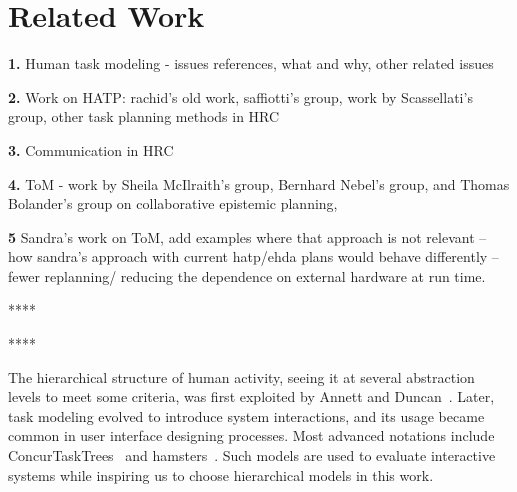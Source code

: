 \documentclass[letterpaper]{article} %
\begin{document}

\section{Related Work}
\textbf{1.} Human task modeling - issues references, what and why, other related issues

\textbf{2.} Work on HATP: rachid's old work, saffiotti's group, work by Scassellati's group, other task planning methods in HRC

\textbf{3.} Communication in HRC

\textbf{4.} ToM - work by Sheila McIlraith's group, Bernhard Nebel's group, and Thomas Bolander's group on collaborative epistemic planning, 

\textbf{5} Sandra's work on ToM, add examples where that approach is not relevant   -- how sandra's approach with current hatp/ehda plans would behave differently -- fewer replanning/ reducing the dependence on external hardware at run time.


****

****

The hierarchical structure of human activity, seeing it at several abstraction levels to meet some criteria, was first exploited by Annett and Duncan~\citeyear{annett1967task}. Later, task modeling evolved to introduce system interactions, and its usage became common in user interface designing processes. Most advanced notations include {\sc ConcurTaskTrees}~\cite{paterno2004concurtasktrees} and {\sc hamsters}~\cite{martinie2019analysing}.
Such models are used to evaluate interactive systems while inspiring us to choose hierarchical models in this work.
\end{document}
